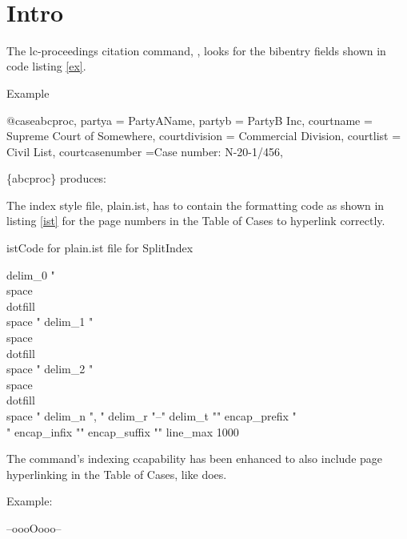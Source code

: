 
\maketitle
\tableofcontents

\let\xoldtwocolumn\twocolumn
\iftoggle{printlegtoc}{%
\let\oldtwocolumn\twocolumn
\renewcommand{\twocolumn}[1][]{#1}
\let\oldclearpage\clearpage
\renewcommand\clearpage{\relax}
\extendtheindex{}{\useindexpreamble}{}{}
\printindex[cases]
\printindex[legislation]
\iftoggle{printregulations}{\printindex[regulations]}{}
\renewcommand{\twocolumn}[1][]{\oldtwocolumn}
\renewcommand\clearpage{\oldclearpage}
}{}
\bigskip
\hfill{}\hfill\ %
\bigskip




\section{Intro}
The lc-proceedings citation command, , looks for the bibentry fields shown in code listing \ref{ex}.

\begin{dov}{ex}{Example}

@case{abcproc,
  partya = {PartyAName},
  partyb = {PartyB Inc},
  courtname = {Supreme Court of Somewhere},
  courtdivision = {Commercial Division},
  courtlist = {Civil List},
  courtcasenumber ={Case number: N-20-1/456},
}

\end{dov}

\{abcproc\} produces: 

\bigskip

The index style file, plain.ist, has to contain the formatting code as shown in listing \ref{ist} for the page numbers in the Table of Cases to hyperlink correctly.


\begin{dov}{ist}{Code for plain.ist file for SplitIndex}

delim_0 "\\space\\dotfill\\space "\hss
delim_1 "\\space\\dotfill\\space "\hss
delim_2 "\\space\\dotfill\\space "\hss
delim_n ", "
delim_r "--"
delim_t ""
encap_prefix "\\"
encap_infix "{"
encap_suffix "}"
line_max 1000

\end{dov}


\newpage
{}

\newpage
The  command's indexing ccapability has been enhanced to also include page hyperlinking in the Table of Cases, like  does.

Example:



\bigskip
\bigskip
\hfill --oooOooo--\hfill\ 








